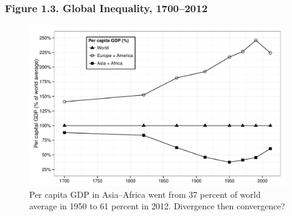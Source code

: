 \documentclass[t]{beamer}\usepackage[]{graphicx}\usepackage[]{color}
\newenvironment{knitrout}{}{} %
\begin{document}
\begin{frame}[label=Figure_1_3,fragile]
\frametitle{Figure 1.3. Global Inequality, 1700--2012}
\begin{figure}[t]
\begin{minipage}[b]{\textwidth}
\centering
\begin{knitrout}\footnotesize
{}\color{fgcolor}

{\centering \includegraphics[width=1\linewidth]{figures/bw/Figure_1_3} 

}



\end{knitrout}
\caption{Per capita GDP in Asia--Africa went from 37 percent of world average in 1950 to 61 percent in 2012. Divergence then convergence?}
\end{minipage}
\end{figure}
\end{frame}
\end{document}
